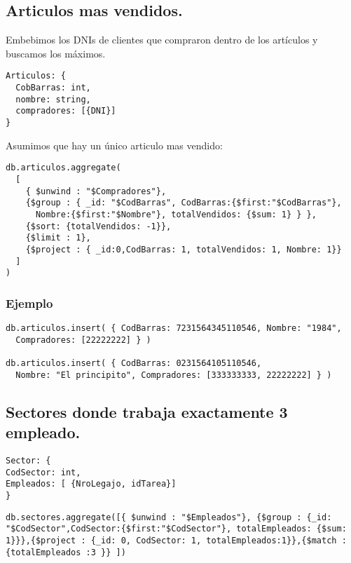 \subsection{Articulos mas vendidos.}
Embebimos los DNIs de clientes que compraron dentro de los artículos y buscamos los máximos.

\begin{lstlisting}
Articulos: {
  CobBarras: int,
  nombre: string,
  compradores: [{DNI}]
}
\end{lstlisting}

Asumimos que hay un único articulo mas vendido:
\begin{lstlisting}
db.articulos.aggregate(
  [
    { $unwind : "$Compradores"},
    {$group : { _id: "$CodBarras", CodBarras:{$first:"$CodBarras"},
      Nombre:{$first:"$Nombre"}, totalVendidos: {$sum: 1} } },
    {$sort: {totalVendidos: -1}},
    {$limit : 1},
    {$project : { _id:0,CodBarras: 1, totalVendidos: 1, Nombre: 1}}
  ]
)
\end{lstlisting}

\subsubsection{Ejemplo}

\begin{lstlisting}
db.articulos.insert( { CodBarras: 7231564345110546, Nombre: "1984",
  Compradores: [22222222] } )

db.articulos.insert( { CodBarras: 0231564105110546,
  Nombre: "El principito", Compradores: [333333333, 22222222] } )
\end{lstlisting}


\subsection{Sectores donde trabaja exactamente 3 empleado.}

\begin{lstlisting}
Sector: {
CodSector: int,
Empleados: [ {NroLegajo, idTarea}]
}

\end{lstlisting}

\begin{lstlisting}
db.sectores.aggregate([{ $unwind : "$Empleados"}, {$group : {_id: "$CodSector",CodSector:{$first:"$CodSector"}, totalEmpleados: {$sum: 1}}},{$project : {_id: 0, CodSector: 1, totalEmpleados:1}},{$match : {totalEmpleados :3 }} ])
\end{lstlisting}


